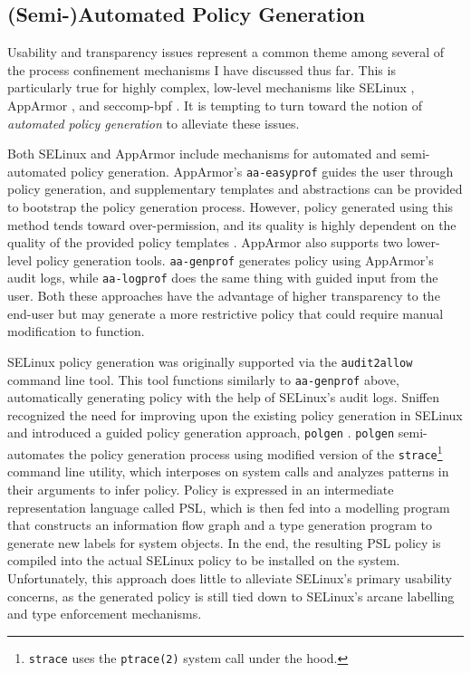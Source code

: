 \documentclass[dvipsnames, 12pt]{article}
\begin{document}
\subsection{(Semi-)Automated Policy Generation}

Usability and transparency issues represent a common theme among several of the
process confinement mechanisms I have discussed thus far. This is particularly
true for highly complex, low-level mechanisms like SELinux
\cite{smalley2001_selinux}, AppArmor \cite{cowan2000_apparmor}, and seccomp-bpf
\cite{drewry2012_seccomp_bpf,seccomp_bpf}. It is tempting to turn toward the
notion of \textit{automated policy generation} to alleviate these issues.

Both SELinux and AppArmor include mechanisms for automated and semi-automated
policy generation.  AppArmor's \texttt{aa-easyprof} \cite{aa_easyprof} guides
the user through policy generation, and supplementary templates and abstractions
can be provided to bootstrap the policy generation process. However, policy
generated using this method tends toward over-permission, and its quality is
highly dependent on the quality of the provided policy templates
\cite{aa_easyprof}.  AppArmor also supports two lower-level policy generation
tools.  \texttt{aa-genprof} \cite{aa_genprof} generates policy using AppArmor's
audit logs, while \texttt{aa-logprof} \cite{aa_logprof} does the same thing with
guided input from the user. Both these approaches have the advantage of higher
transparency to the end-user but may generate a more restrictive policy that
could require manual modification to function.

SELinux policy generation was originally supported via the \texttt{audit2allow}
\cite{audit2allow} command line tool. This tool functions similarly to
\texttt{aa-genprof} \cite{aa_genprof} above, automatically generating policy
with the help of SELinux's audit logs. Sniffen \etal recognized the need for
improving upon the existing policy generation in SELinux and introduced a guided
policy generation approach, \texttt{polgen} \cite{sniffen06_guided}.
\texttt{polgen} semi-automates the policy generation process using modified
version of the \texttt{strace}\footnote{\texttt{strace} uses the
\texttt{ptrace(2)} system call under the hood.} command line utility, which
interposes on system calls and analyzes patterns in their arguments to infer
policy. Policy is expressed in an intermediate representation language called
PSL, which is then fed into a modelling program that constructs an information
flow graph and a type generation program to generate new labels for system
objects. In the end, the resulting PSL policy is compiled into the actual
SELinux policy to be installed on the system. Unfortunately, this approach does
little to alleviate SELinux's primary usability concerns, as the generated
policy is still tied down to SELinux's arcane labelling and type enforcement
mechanisms.
\end{document}
